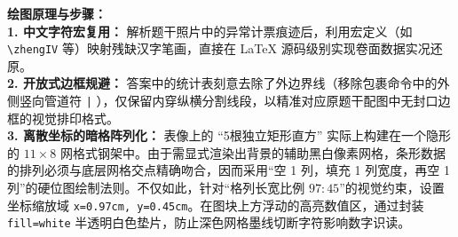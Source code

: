 \vspace{0.4cm}
{\small\color{blue!70!black}
\textbf{绘图原理与步骤：}\\
\textbf{1. 中文字符宏复用：} 解析题干照片中的异常计票痕迹后，利用宏定义（如 \texttt{\textbackslash zhengIV} 等）映射残缺汉字笔画，直接在 LaTeX 源码级别实现卷面数据实况还原。\\
\textbf{2. 开放式边框规避：} 答案中的统计表刻意去除了外边界线（移除包裹命令中的外侧竖向管道符 \texttt{|} ），仅保留内穿纵横分割线段，以精准对应原题干配图中无封口边框的视觉排印格式。\\
\textbf{3. 离散坐标的暗格阵列化：} 表像上的 “5根独立矩形直方” 实际上构建在一个隐形的 $11 \times 8$ 网格式钢架中。由于需显式渲染出背景的辅助黑白像素网格，条形数据的排列必须与底层网格交点精确吻合，因而采用“空 1 列，填充 1 列宽度，再空 1 列”的硬位图绘制法则。不仅如此，针对“格列长宽比例 $97:45$”的视觉约束，设置坐标缩放域 \texttt{x=0.97cm, y=0.45cm}。在图块上方浮动的高亮数值区，通过封装 \texttt{fill=white} 半透明白色垫片，防止深色网格墨线切断字符影响数字识读。
}


\newpage
